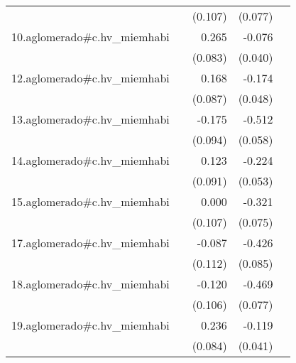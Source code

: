 {\begin{longtable}{l*{4}{D{.}{.}{-1}}}
            &                     &     (0.107)         &     (0.077)         &                     \\
\addlinespace
10.aglomerado#c.hv\_miemhabi&                     &       0.265\sym{**} &      -0.076         &                     \\
            &                     &     (0.083)         &     (0.040)         &                     \\
\addlinespace
12.aglomerado#c.hv\_miemhabi&                     &       0.168         &      -0.174\sym{***}&                     \\
            &                     &     (0.087)         &     (0.048)         &                     \\
\addlinespace
13.aglomerado#c.hv\_miemhabi&                     &      -0.175         &      -0.512\sym{***}&                     \\
            &                     &     (0.094)         &     (0.058)         &                     \\
\addlinespace
14.aglomerado#c.hv\_miemhabi&                     &       0.123         &      -0.224\sym{***}&                     \\
            &                     &     (0.091)         &     (0.053)         &                     \\
\addlinespace
15.aglomerado#c.hv\_miemhabi&                     &       0.000         &      -0.321\sym{***}&                     \\
            &                     &     (0.107)         &     (0.075)         &                     \\
\addlinespace
17.aglomerado#c.hv\_miemhabi&                     &      -0.087         &      -0.426\sym{***}&                     \\
            &                     &     (0.112)         &     (0.085)         &                     \\
\addlinespace
18.aglomerado#c.hv\_miemhabi&                     &      -0.120         &      -0.469\sym{***}&                     \\
            &                     &     (0.106)         &     (0.077)         &                     \\
\addlinespace
19.aglomerado#c.hv\_miemhabi&                     &       0.236\sym{**} &      -0.119\sym{**} &                     \\
            &                     &     (0.084)         &     (0.041)         &                     \\

\end{longtable}}
